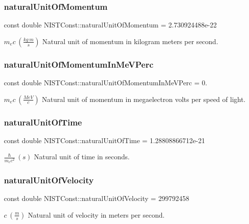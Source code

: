 \subsubsection{\texorpdfstring{natural\+Unit\+Of\+Momentum}{naturalUnitOfMomentum}}
{\footnotesize\ttfamily const double N\+I\+S\+T\+Const\+::natural\+Unit\+Of\+Momentum = 2.\+730924488e-\/22}

$m_e c \ (\frac{kg\ m}{s})$ Natural unit of momentum in kilogram meters per second. \mbox{\label{group___n_i_s_t_const-_natural_unit_ga4ac7dedeaf24fa9d4baa8331a85ab4ca}} 
\subsubsection{\texorpdfstring{natural\+Unit\+Of\+Momentum\+In\+Me\+V\+Perc}{naturalUnitOfMomentumInMeVPerc}}
{\footnotesize\ttfamily const double N\+I\+S\+T\+Const\+::natural\+Unit\+Of\+Momentum\+In\+Me\+V\+Perc = 0.}

$m_e c \ (\frac{MeV}{c})$ Natural unit of momentum in megaelectron volts per speed of light. \mbox{\label{group___n_i_s_t_const-_natural_unit_ga20f1d962c5213c24d1350ee6a64e3a67}} 
\subsubsection{\texorpdfstring{natural\+Unit\+Of\+Time}{naturalUnitOfTime}}
{\footnotesize\ttfamily const double N\+I\+S\+T\+Const\+::natural\+Unit\+Of\+Time = 1.\+28808866712e-\/21}

$\frac{\hbar}{m_e c^2} \ (s)$ Natural unit of time in seconds. \mbox{\label{group___n_i_s_t_const-_natural_unit_ga4dcc4091af025cbd895e8bea1e265c32}} 
\subsubsection{\texorpdfstring{natural\+Unit\+Of\+Velocity}{naturalUnitOfVelocity}}
{\footnotesize\ttfamily const double N\+I\+S\+T\+Const\+::natural\+Unit\+Of\+Velocity = 299792458}

$c \ (\frac{m}{s})$ Natural unit of velocity in meters per second. 